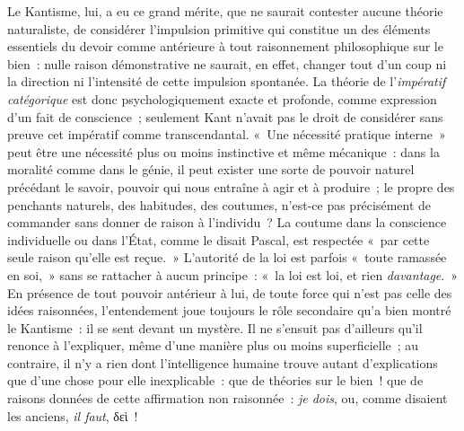 \documentclass[french,twoside]{book} %
\begin{document}
Le Kantisme, lui, a eu ce grand mérite, que ne saurait contester aucune théorie naturaliste, de considérer l’impulsion primitive qui constitue un des éléments essentiels du devoir comme antérieure à tout raisonnement philosophique sur le bien : nulle raison démonstrative ne saurait, en effet, changer tout d’un coup ni la direction ni l’intensité de cette impulsion spontanée. La théorie de l’\emph{impératif catégorique} est donc psychologiquement exacte et profonde, comme expression d’un fait de conscience ; seulement Kant n’avait pas le droit de considérer sans preuve cet impératif comme transcendantal. « Une nécessité pratique interne » peut être une nécessité plus ou moins instinctive et même mécanique : dans la moralité comme dans le génie, il peut exister une sorte de pouvoir naturel précédant le savoir, pouvoir qui nous entraîne à agir et à produire ; le propre des penchants naturels, des habitudes, des coutumes, n’est-ce pas précisément de commander sans donner de raison à l’individu ? La coutume dans la conscience individuelle ou dans l’État, comme le disait Pascal, est respectée « par cette seule raison qu’elle est reçue. » L’autorité de la loi est parfois « toute ramassée en soi, » sans se rattacher à aucun principe : « la loi est loi, et rien \emph{davantage}. » En présence de tout pouvoir antérieur à lui, de toute force qui n’est pas celle des idées raisonnées, l’entendement joue toujours le rôle secondaire qu’a bien montré le Kantisme : il se sent devant un mystère. Il ne s’ensuit pas d’ailleurs qu’il renonce à l’expliquer, même d’une manière plus ou moins superficielle ; au contraire, il n’y a rien dont l’intelligence humaine trouve autant d’explications que d’une chose pour elle inexplicable : que de théories sur le bien ! que de raisons données de cette affirmation non raisonnée : \emph{je dois}, ou, comme disaient les anciens, \emph{il faut}, δεὶ !\par
\end{document}
